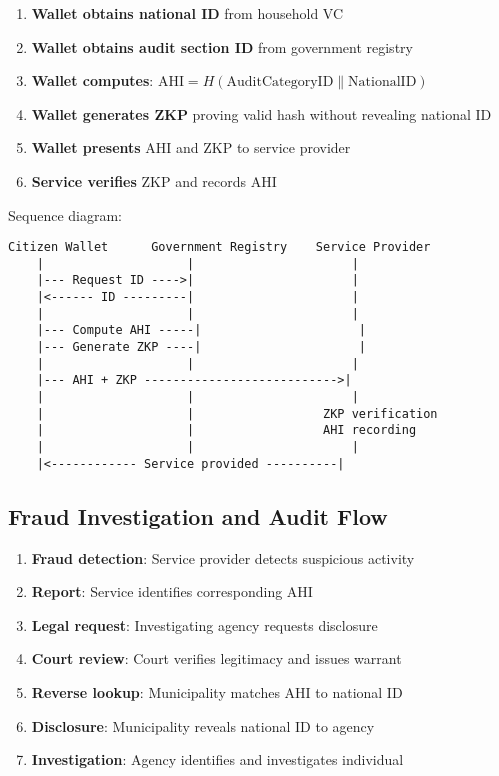 \begin{enumerate}
  \item \textbf{Wallet obtains national ID} from household VC
  \item \textbf{Wallet obtains audit section ID} from government registry
  \item \textbf{Wallet computes}: $\text{AHI} = H(\text{AuditCategoryID} \parallel \text{NationalID})$
  \item \textbf{Wallet generates ZKP} proving valid hash without revealing national ID
  \item \textbf{Wallet presents} AHI and ZKP to service provider
  \item \textbf{Service verifies} ZKP and records AHI
\end{enumerate}

Sequence diagram:
\begin{verbatim}
Citizen Wallet      Government Registry    Service Provider
    |                    |                      |
    |--- Request ID ---->|                      |
    |<------ ID ---------|                      |
    |                    |                      |
    |--- Compute AHI -----|                      |
    |--- Generate ZKP ----|                      |
    |                    |                      |
    |--- AHI + ZKP --------------------------->|
    |                    |                      |
    |                    |                  ZKP verification
    |                    |                  AHI recording
    |                    |                      |
    |<------------ Service provided ----------|
\end{verbatim}

\subsection{Fraud Investigation and Audit Flow}

\begin{enumerate}
  \item \textbf{Fraud detection}: Service provider detects suspicious activity
  \item \textbf{Report}: Service identifies corresponding AHI
  \item \textbf{Legal request}: Investigating agency requests disclosure
  \item \textbf{Court review}: Court verifies legitimacy and issues warrant
  \item \textbf{Reverse lookup}: Municipality matches AHI to national ID
  \item \textbf{Disclosure}: Municipality reveals national ID to agency
  \item \textbf{Investigation}: Agency identifies and investigates individual
\end{enumerate}

